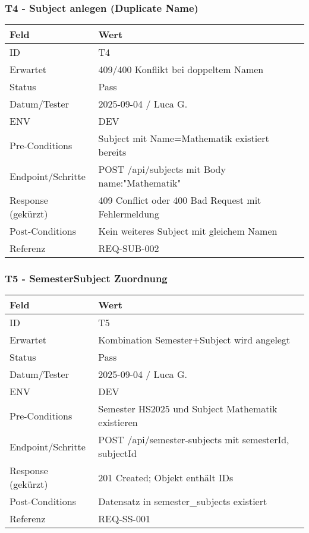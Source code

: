 \documentclass[12pt,a4paper]{article}
\begin{document}
    \subsubsection{T4 - Subject anlegen (Duplicate Name)}
    {\small
        \begin{tabularx}{\textwidth}{|p{3.2cm}|X|}
            \hline
            \textbf{Feld} & \textbf{Wert} \\ \hline
            ID & T4 \\ \hline
            Erwartet & 409/400 Konflikt bei doppeltem Namen \\ \hline
            Status & Pass \\ \hline
            Datum/Tester & 2025-09-04 / Luca G. \\ \hline
            ENV & DEV \\ \hline
            Pre-Conditions & Subject mit Name=Mathematik existiert bereits \\ \hline
            Endpoint/Schritte & POST /api/subjects mit Body {name:"Mathematik"} \\ \hline
            Response (gekürzt) & 409 Conflict oder 400 Bad Request mit Fehlermeldung \\ \hline
            Post-Conditions & Kein weiteres Subject mit gleichem Namen \\ \hline
            Referenz & REQ-SUB-002 \\ \hline
        \end{tabularx}
    }

    \subsubsection{T5 - SemesterSubject Zuordnung}
    {\small
        \begin{tabularx}{\textwidth}{|p{3.2cm}|X|}
            \hline
            \textbf{Feld} & \textbf{Wert} \\ \hline
            ID & T5 \\ \hline
            Erwartet & Kombination Semester+Subject wird angelegt \\ \hline
            Status & Pass \\ \hline
            Datum/Tester & 2025-09-04 / Luca G. \\ \hline
            ENV & DEV \\ \hline
            Pre-Conditions & Semester HS2025 und Subject Mathematik existieren \\ \hline
            Endpoint/Schritte & POST /api/semester-subjects mit {semesterId, subjectId} \\ \hline
            Response (gekürzt) & 201 Created; Objekt enthält IDs \\ \hline
            Post-Conditions & Datensatz in semester_subjects existiert \\ \hline
            Referenz & REQ-SS-001 \\ \hline
        \end{tabularx}
    }
\end{document}
